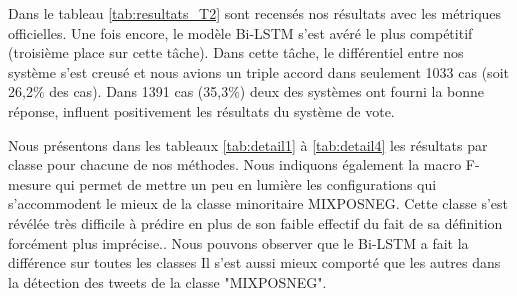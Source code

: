  Dans le tableau \ref{tab:resultats_T2} sont recensés nos résultats avec les métriques officielles.
 Une fois encore, le modèle Bi-LSTM s'est avéré le plus compétitif (troisième place sur cette tâche).
Dans cette tâche, le différentiel entre nos système s'est creusé et nous avions un triple accord dans seulement 1033 cas (soit 26,2\% des cas). Dans 1391 cas (35,3\%) deux des systèmes ont fourni la bonne réponse, influent positivement les résultats du système de vote.

 



Nous présentons dans les tableaux \ref{tab:detail1} à \ref{tab:detail4} les résultats par classe pour chacune de nos méthodes.
 Nous indiquons également la macro F-mesure qui permet de mettre un peu en lumière les configurations qui s'accommodent le mieux de la classe minoritaire MIXPOSNEG. Cette classe s'est révélée très difficile à prédire en plus de son faible effectif du fait de sa définition forcément plus imprécise..
 Nous pouvons observer que le Bi-LSTM a fait la différence sur toutes les classes
 Il s'est aussi mieux comporté que les autres dans la détection des tweets de la classe "MIXPOSNEG".
